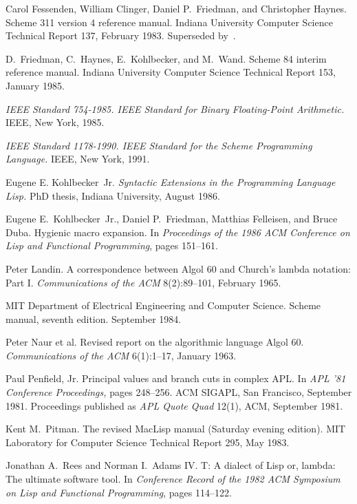 \begin{thebibliography}{999}
Carol Fessenden, William Clinger, Daniel P.~Friedman, and Christopher Haynes.
Scheme 311 version 4 reference manual.
Indiana University Computer Science Technical Report 137, February 1983.
Superseded by~\cite{Scheme84}.

D.~Friedman, C.~Haynes, E.~Kohlbecker, and M.~Wand.
Scheme 84 interim reference manual.
Indiana University Computer Science Technical Report 153, January 1985.

{\em IEEE Standard 754-1985.  IEEE Standard for Binary Floating-Point
Arithmetic.}  IEEE, New York, 1985.

{\em IEEE Standard 1178-1990.  IEEE Standard for the Scheme
  Programming Language.}  IEEE, New York, 1991.

Eugene E. Kohlbecker~Jr.
{\em Syntactic Extensions in the Programming Language Lisp.}
PhD thesis, Indiana University, August 1986.

Eugene E.~Kohlbecker~Jr., Daniel P.~Friedman, Matthias Felleisen, and Bruce Duba.
Hygienic macro expansion.
In {\em Proceedings of the 1986 ACM Conference on Lisp
  and Functional Programming}, pages 151--161.

Peter Landin.
A correspondence between Algol 60 and Church's lambda notation: Part I.
{\em Communications of the ACM} 8(2):89--101, February 1965.

MIT Department of Electrical Engineering and Computer Science.
Scheme manual, seventh edition.
September 1984.

Peter Naur et al.
Revised report on the algorithmic language Algol 60.
{\em Communications of the ACM} 6(1):1--17, January 1963.

Paul Penfield, Jr.
Principal values and branch cuts in complex APL.
In {\em APL '81 Conference Proceedings,} pages 248--256.
ACM SIGAPL, San Francisco, September 1981.
Proceedings published as {\em APL Quote Quad} 12(1), ACM, September 1981.

Kent M.~Pitman.
The revised MacLisp manual (Saturday evening edition).
MIT Laboratory for Computer Science Technical Report 295, May 1983.

Jonathan A.~Rees and Norman I.~Adams IV.
T: A dialect of Lisp or, lambda: The ultimate software tool.
In {\em Conference Record of the 1982 ACM Symposium on Lisp and
  Functional Programming}, pages 114--122.


\end{thebibliography}
